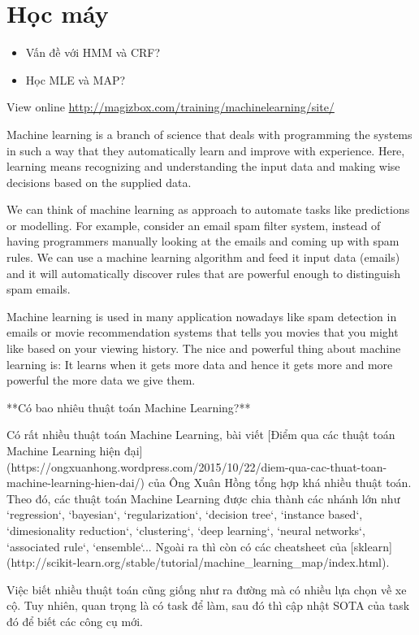 \chapter{Học máy}

\begin{itemize}
  \item Vấn đề với HMM và CRF?
  \item Học MLE và MAP?
\end{itemize}

View online \href{http://magizbox.com/training/machinelearning/site/}{http://magizbox.com/training/machinelearning/site/}

Machine learning is a branch of science that deals with programming the systems in such a way that they automatically learn and improve with experience. Here, learning means recognizing and understanding the input data and making wise decisions based on the supplied data.

We can think of machine learning as approach to automate tasks like predictions or modelling. For example, consider an email spam filter system, instead of having programmers manually looking at the emails and coming up with spam rules. We can use a machine learning algorithm and feed it input data (emails) and it will automatically discover rules that are powerful enough to distinguish spam emails.

Machine learning is used in many application nowadays like spam detection in emails or movie recommendation systems that tells you movies that you might like based on your viewing history. The nice and powerful thing about machine learning is: It learns when it gets more data and hence it gets more and more powerful the more data we give them.

**Có bao nhiêu thuật toán Machine Learning?**

Có rất nhiều thuật toán Machine Learning, bài viết [Điểm qua các thuật toán Machine Learning hiện đại](https://ongxuanhong.wordpress.com/2015/10/22/diem-qua-cac-thuat-toan-machine-learning-hien-dai/) của Ông Xuân Hồng tổng hợp khá nhiều thuật toán. Theo đó, các thuật toán Machine Learning được chia thành các nhánh lớn như `regression`, `bayesian`, `regularization`, `decision tree`, `instance based`, `dimesionality reduction`, `clustering`, `deep learning`, `neural networks`, `associated rule`, `ensemble`... Ngoài ra thì còn có các cheatsheet của [sklearn](http://scikit-learn.org/stable/tutorial/machine_learning_map/index.html).

Việc biết nhiều thuật toán cũng giống như ra đường mà có nhiều lựa chọn về xe cộ. Tuy nhiên, quan trọng là có task để làm, sau đó thì cập nhật SOTA của task đó để biết các công cụ mới.

